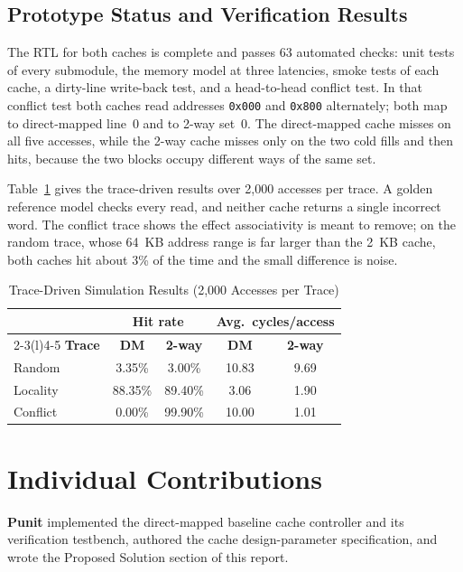 \documentclass[conference]{IEEEtran}
\begin{document}
\subsection{Prototype Status and Verification Results}
The RTL for both caches is complete and passes 63 automated checks: unit tests of every submodule, the memory model at three latencies, smoke tests of each cache, a dirty-line write-back test, and a head-to-head conflict test. In that conflict test both caches read addresses \texttt{0x000} and \texttt{0x800} alternately; both map to direct-mapped line~0 and to 2-way set~0. The direct-mapped cache misses on all five accesses, while the 2-way cache misses only on the two cold fills and then hits, because the two blocks occupy different ways of the same set.

Table~\ref{tab:results} gives the trace-driven results over 2,000 accesses per trace. A golden reference model checks every read, and neither cache returns a single incorrect word. The conflict trace shows the effect associativity is meant to remove; on the random trace, whose 64~KB address range is far larger than the 2~KB cache, both caches hit about 3\% of the time and the small difference is noise.

\begin{table}[h]
\centering
\caption{Trace-Driven Simulation Results (2,000 Accesses per Trace)}
\label{tab:results}
\begin{tabular}{@{}lcccc@{}}
\toprule
 & \multicolumn{2}{c}{\textbf{Hit rate}} & \multicolumn{2}{c}{\textbf{Avg.\ cycles/access}} \\
\cmidrule(lr){2-3}\cmidrule(l){4-5}
\textbf{Trace} & \textbf{DM} & \textbf{2-way} & \textbf{DM} & \textbf{2-way} \\
\midrule
Random   & 3.35\%  & 3.00\%  & 10.83 & 9.69 \\
Locality & 88.35\% & 89.40\% & 3.06  & 1.90 \\
Conflict & 0.00\%  & 99.90\% & 10.00 & 1.01 \\
\bottomrule
\end{tabular}
\end{table}

\section{Individual Contributions}
\textbf{Punit} implemented the direct-mapped baseline cache controller and its verification testbench, authored the cache design-parameter specification, and wrote the Proposed Solution section of this report.
\end{document}
